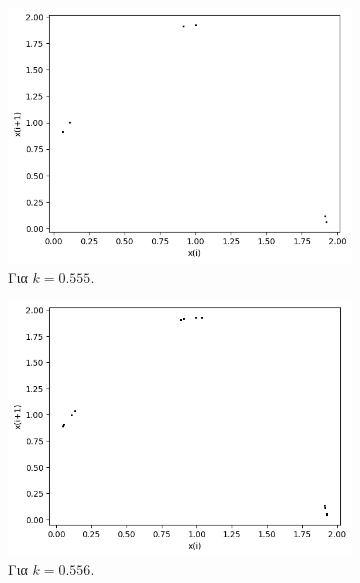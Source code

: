 \begin{figure}[h!]
	\centering
	
	\begin{subfigure}[b]{0.4\textwidth}
		\centering
		\includegraphics[width=\textwidth]{LateX images/graphs q03/g9}
		\caption{Για $k=0.555$.}
		\label{f:k21}
	\end{subfigure}
	\hfill
	\begin{subfigure}[b]{0.4\textwidth}
		\centering
		\includegraphics[width=\textwidth]{LateX images/graphs q03/g10}
		\caption{Για $k=0.556$.}
		\label{f:k22}
	\end{subfigure}
	\hfill
	\begin{subfigure}[b]{0.4\textwidth}
		\centering

\end{subfigure}
\end{figure}
